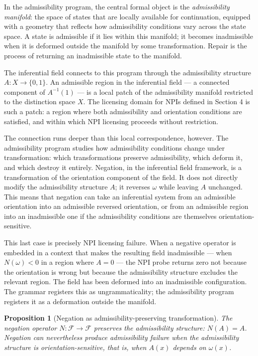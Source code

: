 \documentclass[12pt]{article}
\newtheorem{proposition}[theorem]{Proposition}
\theoremstyle{remark}
\begin{document}
In the admissibility program, the central formal object is the
\emph{admissibility manifold}: the space of states that are locally
available for continuation, equipped with a geometry that reflects how
admissibility conditions vary across the state space. A state is
admissible if it lies within this manifold; it becomes inadmissible when
it is deformed outside the manifold by some transformation. Repair is
the process of returning an inadmissible state to the manifold.

The inferential field connects to this program through the admissibility
structure $A : X \to \{0,1\}$. An admissible region in the inferential
field --- a connected component of $A^{-1}(1)$ --- is a local patch of
the admissibility manifold restricted to the distinction space $X$. The
licensing domain for NPIs defined in Section 4 is such a patch: a region
where both admissibility and orientation conditions are satisfied, and
within which NPI licensing proceeds without restriction.

The connection runs deeper than this local correspondence, however. The
admissibility program studies how admissibility conditions change under
transformation: which transformations preserve admissibility, which
deform it, and which destroy it entirely. Negation, in the inferential
field framework, is a transformation of the orientation component of the
field. It does not directly modify the admissibility structure $A$; it
reverses $\omega$ while leaving $A$ unchanged. This means that negation
can take an inferential system from an admissible orientation into an
admissible reversed orientation, or from an admissible region into an
inadmissible one if the admissibility conditions are themselves
orientation-sensitive.

This last case is precisely NPI licensing failure. When a negative
operator is embedded in a context that makes the resulting field
inadmissible --- when $N(\omega) < 0$ in a region where $A = 0$ ---
the NPI probe returns zero not because the orientation is wrong but
because the admissibility structure excludes the relevant region. The
field has been deformed into an inadmissible configuration. The grammar
registers this as ungrammaticality; the admissibility program registers
it as a deformation outside the manifold.

\begin{proposition}[Negation as admissibility-preserving transformation]
\label{prop:adm-preserving}
The negation operator $N : \mathcal{F} \to \mathcal{F}$ preserves the
admissibility structure: $N(A) = A$. Negation can nevertheless produce
admissibility failure when the admissibility structure is
orientation-sensitive, that is, when $A(x)$ depends on $\omega(x)$.
\end{proposition}
\end{document}
